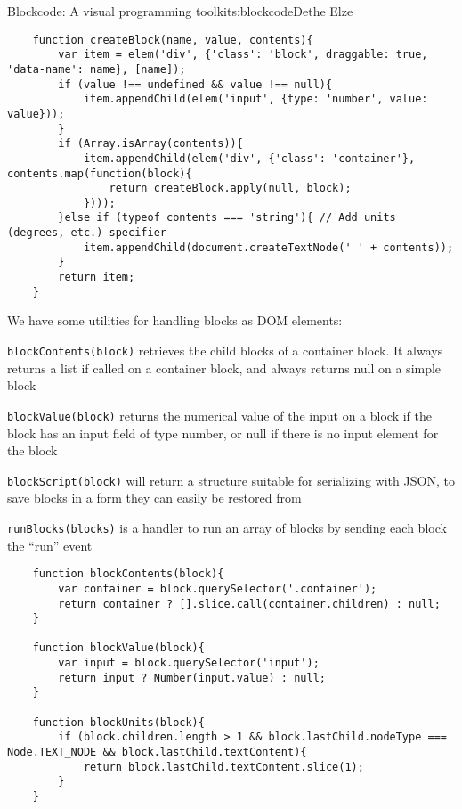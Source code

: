 \begin{aosachapter}{Blockcode: A visual programming toolkit}{s:blockcode}{Dethe Elze}
\begin{verbatim}
    function createBlock(name, value, contents){
        var item = elem('div', {'class': 'block', draggable: true, 'data-name': name}, [name]);
        if (value !== undefined && value !== null){
            item.appendChild(elem('input', {type: 'number', value: value}));
        }
        if (Array.isArray(contents)){
            item.appendChild(elem('div', {'class': 'container'}, contents.map(function(block){
                return createBlock.apply(null, block);
            })));
        }else if (typeof contents === 'string'){ // Add units (degrees, etc.) specifier
            item.appendChild(document.createTextNode(' ' + contents));
        }
        return item;
    }
\end{verbatim}

We have some utilities for handling blocks as DOM elements:

\begin{aosaitemize}

\item
  \texttt{blockContents(block)} retrieves the child blocks of a
  container block. It always returns a list if called on a container
  block, and always returns null on a simple block
\item
  \texttt{blockValue(block)} returns the numerical value of the input on
  a block if the block has an input field of type number, or null if
  there is no input element for the block
\item
  \texttt{blockScript(block)} will return a structure suitable for
  serializing with JSON, to save blocks in a form they can easily be
  restored from
\item
  \texttt{runBlocks(blocks)} is a handler to run an array of blocks by
  sending each block the ``run'' event
\end{aosaitemize}

\begin{verbatim}
    function blockContents(block){
        var container = block.querySelector('.container');
        return container ? [].slice.call(container.children) : null;
    }

    function blockValue(block){
        var input = block.querySelector('input');
        return input ? Number(input.value) : null;
    }

    function blockUnits(block){
        if (block.children.length > 1 && block.lastChild.nodeType === Node.TEXT_NODE && block.lastChild.textContent){
            return block.lastChild.textContent.slice(1);
        }
    }


\end{verbatim}
\end{aosachapter}

